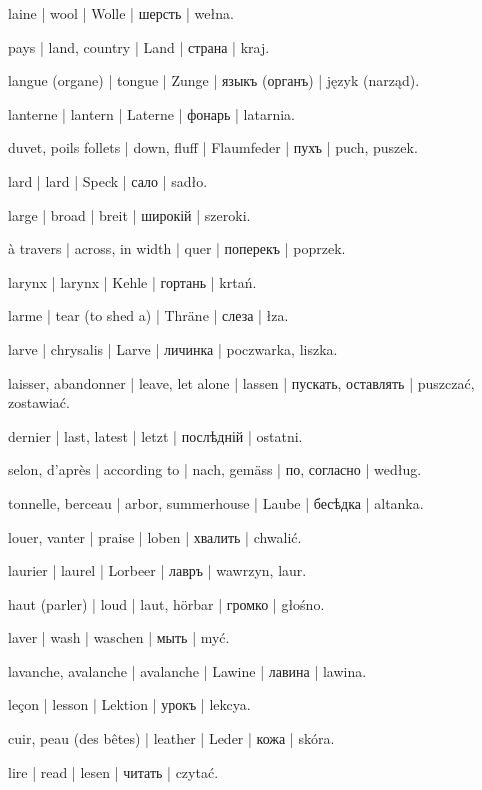 \begin{outdent}{1em}
laine | wool | Wolle | шерсть | wełna.

pays | land, country | Land | страна | kraj.

langue (organe) | tongue | Zunge | языкъ (органъ) | język (narząd).

lanterne | lantern | Laterne | фонарь | latarnia.

duvet, poils follets | down, fluff | Flaumfeder | пухъ | puch, puszek.

lard | lard | Speck | сало | sadło.

large | broad | breit | широкій | szeroki.

\uvsubentry{}
à travers | across, in width | quer | поперекъ | poprzek.

larynx | larynx | Kehle | гортань | krtań.

larme | tear (to shed a) | Thräne | слеза | łza.

larve | chrysalis | Larve | личинка | poczwarka, liszka.

laisser, abandonner | leave, let alone | lassen | пускать,
оставлять | puszczać, zostawiać.

dernier | last, latest | letzt | послѣдній | ostatni.

selon, d’après | according to | nach, gemäss | по, согласно | według.

tonnelle, berceau | arbor, summerhouse | Laube | бесѣдка | altanka.

louer, vanter | praise | loben | хвалить | chwalić.

laurier | laurel | Lorbeer | лавръ | wawrzyn, laur.

haut (parler) | loud | laut, hörbar | громко | głośno.

laver | wash | waschen | мыть | myć.

lavanche, avalanche | avalanche | Lawine | лавина | lawina.

leçon | lesson | Lektion | урокъ | lekcya.

cuir, peau (des bêtes) | leather | Leder | кожа | skóra.

lire | read | lesen | читать | czytać.


\end{outdent}

